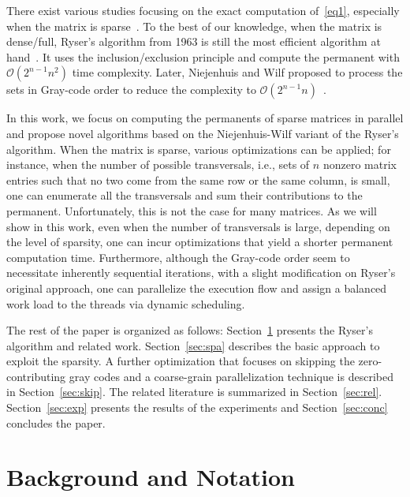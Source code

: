 \documentclass{elektr}
\begin{document}
There exist various studies focusing on the exact computation of~\eqref{eq1}, especially when the matrix is sparse~\cite{mittal01, servedio05, bax08, yue13}. To the best of our knowledge, when the matrix is dense/full, Ryser's algorithm from 1963 is still the most efficient algorithm at hand~\cite{ryser63}. It uses the inclusion/exclusion principle and compute the permanent with $\mathcal{O}(2^{n-1}n^2)$ time complexity. Later, Niejenhuis and Wilf proposed to process the sets in Gray-code order to reduce the complexity to $\mathcal{O}(2^{n-1}n)$~\cite{nijenhuis78}. 

In this work, we focus on computing the permanents of sparse matrices in parallel and propose novel algorithms based on the Niejenhuis-Wilf variant of the Ryser's algorithm. When the matrix is sparse, various optimizations can be applied; for instance, when the number of possible transversals, i.e., sets of $n$ nonzero matrix entries such that no two come from the same row or the same column, is small, one can enumerate all the transversals and sum their contributions to the permanent. Unfortunately, this is not the case for many matrices. As we will show in this work, even when the number of transversals is large, depending on the level of sparsity, one can incur optimizations that yield a shorter permanent computation time. Furthermore, although the Gray-code order seem to necessitate inherently sequential iterations, with a slight modification on Ryser's original approach, one can parallelize the execution flow and assign a balanced work load to the threads via dynamic scheduling. 

The rest of the paper is organized as follows: Section~\ref{sec:back} presents the Ryser's algorithm and related work. Section~\ref{sec:spa} describes the basic approach to exploit the sparsity. A further optimization that focuses on skipping the zero-contributing gray codes and a coarse-grain parallelization technique is described in Section~\ref{sec:skip}. The related literature is summarized in Section~\ref{sec:rel}. Section~\ref{sec:exp} presents the results of the experiments and Section~\ref{sec:conc} concludes the paper.  

\section{Background and Notation}\label{sec:back}
\end{document}

